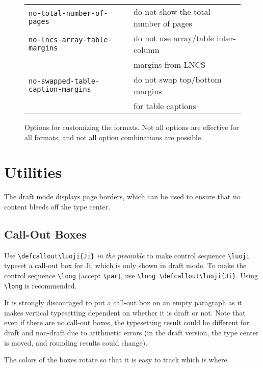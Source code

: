 \begin{figure}
\begin{tabular}{ll}
\texttt{no-total-number-of-pages} & do not show the total number of pages \\
\texttt{no-lncs-array-table-margins} & do not use array/table inter-column \\
& \qquad margins from LNCS \\
\texttt{no-swapped-table-caption-margins} &
do not swap top/bottom margins \\
& \qquad for table captions \\
\bottomrule
\end{tabular}
\caption{Options for customizing the formats.
Not all options are effective for all formats, and
not all option combinations are possible.}
\label{fig:figure1}
\end{figure}

\section{Utilities}

The draft mode displays page borders,
which can be used to ensure that no content bleeds off the type center.

\subsection{Call-Out Boxes}

Use
\texttt{\textbackslash defcallout\textbackslash luoji\{Ji\}}
\emph{in the preamble}
to make
control sequence \texttt{\textbackslash luoji} typeset a call-out box for Ji,
which is only shown in draft mode.
To make the control sequence
\texttt{\textbackslash long} (accept \texttt{\textbackslash par}),
use
\texttt{\textbackslash long%
\textbackslash defcallout\textbackslash luoji\{Ji\}}.
Using \texttt{\textbackslash long} is recommended.


It is strongly discouraged to put a call-out box on an empty paragraph
as it makes vertical typesetting dependent on whether it is draft or not.
Note that even if there are no call-out boxes,
the typesetting result could be different for draft and non-draft
due to arithmetic errors
(in the draft version,
the type center is moved, and
rounding results could change).

The colors of the boxes rotate so that it is easy to track which is where.

